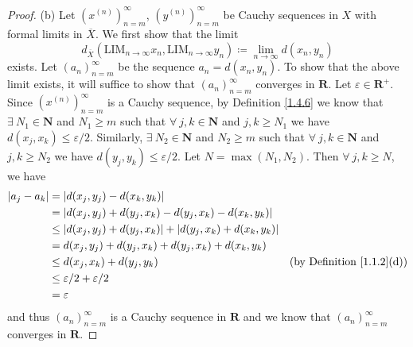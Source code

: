 \begin{proof}{(b)}
    Let \((x^{(n)})_{n = m}^\infty\), \((y^{(n)})_{n = m}^\infty\) be Cauchy sequences in \(X\) with formal limits in \(\overline{X}\).
    We first show that the limit
    \[
        d_{\overline{X}}(\text{LIM}_{n \to \infty} x_n, \text{LIM}_{n \to \infty} y_n) \coloneqq \lim_{n \to \infty} d(x_n, y_n)
    \]
    exists.
    Let \((a_n)_{n = m}^\infty\) be the sequence \(a_n = d(x_n, y_n)\).
    To show that the above limit exists, it will suffice to show that \((a_n)_{n = m}^\infty\) converges in \(\mathbf{R}\).
    Let \(\varepsilon \in \mathbf{R}^+\).
    Since \((x^{(n)})_{n = m}^\infty\) is a Cauchy sequence, by Definition \ref{1.4.6} we know that \(\exists\ N_1 \in \mathbf{N}\) and \(N_1 \geq m\) such that \(\forall\ j, k \in \mathbf{N}\) and \(j, k \geq N_1\) we have \(d(x_j, x_k) \leq \varepsilon / 2\).
    Similarly, \(\exists\ N_2 \in \mathbf{N}\) and \(N_2 \geq m\) such that \(\forall\ j, k \in \mathbf{N}\) and \(j, k \geq N_2\) we have \(d(y_j, y_k) \leq \varepsilon / 2\).
    Let \(N = \max(N_1, N_2)\).
    Then \(\forall\ j, k \geq N\), we have
    \begin{align*}
        \abs*{a_j - a_k} & = \abs*{d(x_j, y_j) - d(x_k, y_k)}                                                                               \\
                         & = \abs*{d(x_j, y_j) + d(y_j, x_k) - d(y_j, x_k) - d(x_k, y_k)}                                                   \\
                         & \leq \abs*{d(x_j, y_j) + d(y_j, x_k)} + \abs*{d(y_j, x_k) + d(x_k, y_k)}                                         \\
                         & = d(x_j, y_j) + d(y_j, x_k) + d(y_j, x_k) + d(x_k, y_k)                                                          \\
                         & \leq d(x_j, x_k) + d(y_j, y_k)                                           & \text{(by Definition \ref{1.1.2}(d))} \\
                         & \leq \varepsilon / 2 + \varepsilon / 2                                                                           \\
                         & = \varepsilon
    \end{align*}
    and thus \((a_n)_{n = m}^\infty\) is a Cauchy sequence in \(\mathbf{R}\) and we know that \((a_n)_{n = m}^\infty\) converges in \(\mathbf{R}\).


\end{proof}
